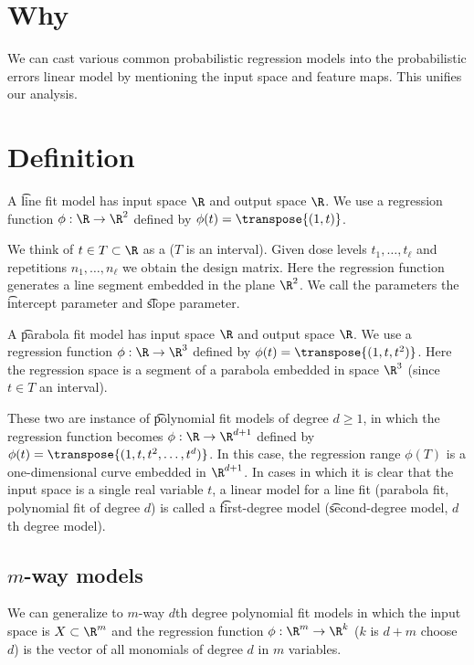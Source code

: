 
\section*{Why}

We can cast various common probabilistic regression models into the probabilistic errors linear model by mentioning the input space and feature maps.
This unifies our analysis.

\section*{Definition}


A \t{line fit model} has input space $\R $ and output space $\R $.
We use a regression function $\phi : \R  \to \R ^2$ defined by $\phi (t) = \transpose{(1, t)}$.

We think of $t \in T \subset \R $ as a  ($T$ is an interval).
Given dose levels $t_1, \dots , t_\ell $ and repetitions $n_1, \dots , n_\ell $ we obtain the design matrix.
Here the regression function generates a line segment embedded in the plane $\R ^2$.
We call the parameters the \t{intercept parameter} and \t{slope parameter}.

A \t{parabola fit model} has input space $\R $ and output space $\R $.
We use a regression function $\phi : \R  \to \R ^3$ defined by $\phi (t) = \transpose{(1, t, t^2)}$.
Here the regression space is a segment of a parabola embedded in space $\R ^3$ (since $t \in T$ an interval).

These two are instance of \t{polynomial fit models} of degree $d \geq 1$, in which the regression function becomes $\phi : \R \to \R ^{d + 1}$ defined by $\phi (t) = \transpose{(1, t, t^2, \dots , t^d)}$.
In this case, the regression range $\phi (T)$ is a one-dimensional curve embedded in $\R ^{d+1}$.
In cases in which it is clear that the input space is a single real variable $t$, a linear model for a line fit (parabola fit, polynomial fit of degree $d$) is called a \t{first-degree model} (\t{second-degree model}, \t{$d$th degree model}).

\subsection*{$m$-way models}

We can generalize to \t{$m$-way $d$th degree polynomial fit models} in which the input space is $X \subset \R ^m$ and the regression function $\phi : \R ^m \to \R ^k$ ($k$ is $d+m$ choose $d$) is the vector of all monomials of degree $d$ in $m$ variables.

